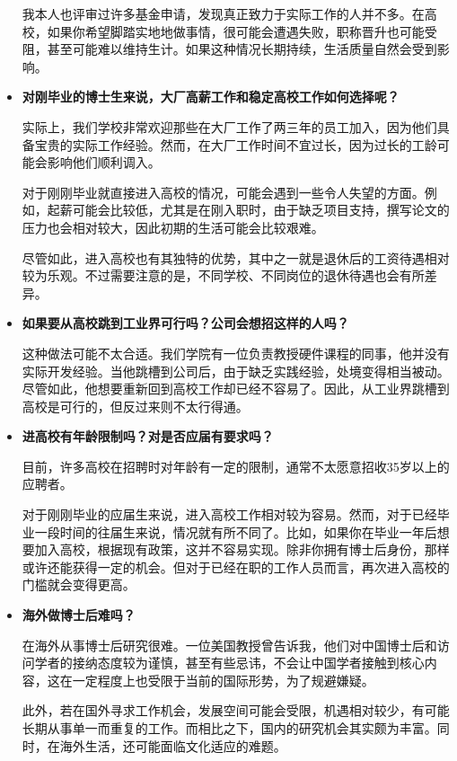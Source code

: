 \begin{itemize}
我本人也评审过许多基金申请，发现真正致力于实际工作的人并不多。在高校，如果你希望脚踏实地地做事情，很可能会遭遇失败，职称晋升也可能受阻，甚至可能难以维持生计。如果这种情况长期持续，生活质量自然会受到影响。


    \item \textbf{对刚毕业的博士生来说，大厂高薪工作和稳定高校工作如何选择呢？}

实际上，我们学校非常欢迎那些在大厂工作了两三年的员工加入，因为他们具备宝贵的实际工作经验。然而，在大厂工作时间不宜过长，因为过长的工龄可能会影响他们顺利调入。

对于刚刚毕业就直接进入高校的情况，可能会遇到一些令人失望的方面。例如，起薪可能会比较低，尤其是在刚入职时，由于缺乏项目支持，撰写论文的压力也会相对较大，因此初期的生活可能会比较艰难。

尽管如此，进入高校也有其独特的优势，其中之一就是退休后的工资待遇相对较为乐观。不过需要注意的是，不同学校、不同岗位的退休待遇也会有所差异。

     \item \textbf{如果要从高校跳到工业界可行吗？公司会想招这样的人吗？}

这种做法可能不太合适。我们学院有一位负责教授硬件课程的同事，他并没有实际开发经验。当他跳槽到公司后，由于缺乏实践经验，处境变得相当被动。尽管如此，他想要重新回到高校工作却已经不容易了。因此，从工业界跳槽到高校是可行的，但反过来则不太行得通。

      \item \textbf{进高校有年龄限制吗？对是否应届有要求吗？}

目前，许多高校在招聘时对年龄有一定的限制，通常不太愿意招收35岁以上的应聘者。

对于刚刚毕业的应届生来说，进入高校工作相对较为容易。然而，对于已经毕业一段时间的往届生来说，情况就有所不同了。比如，如果你在毕业一年后想要加入高校，根据现有政策，这并不容易实现。除非你拥有博士后身份，那样或许还能获得一定的机会。但对于已经在职的工作人员而言，再次进入高校的门槛就会变得更高。


       \item \textbf{海外做博士后难吗？}

在海外从事博士后研究很难。一位美国教授曾告诉我，他们对中国博士后和访问学者的接纳态度较为谨慎，甚至有些忌讳，不会让中国学者接触到核心内容，这在一定程度上也受限于当前的国际形势，为了规避嫌疑。

此外，若在国外寻求工作机会，发展空间可能会受限，机遇相对较少，有可能长期从事单一而重复的工作。而相比之下，国内的研究机会其实颇为丰富。同时，在海外生活，还可能面临文化适应的难题。


\end{itemize}
